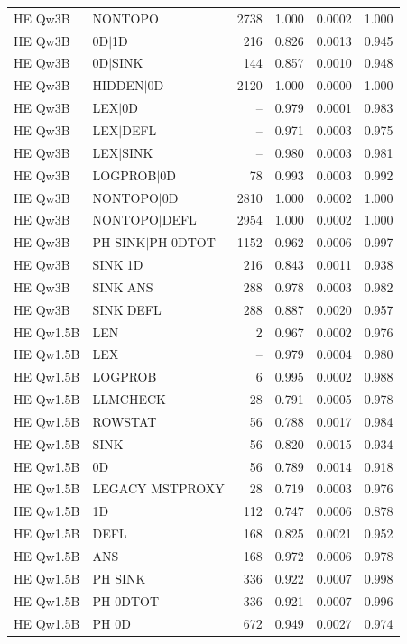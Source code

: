 \begin{longtable}{llrrrr}
HE Qw3B & NONTOPO & 2738 & 1.000 & 0.0002 & 1.000 \\
HE Qw3B & 0D$\mid$1D & 216 & 0.826 & 0.0013 & 0.945 \\
HE Qw3B & 0D$\mid$SINK & 144 & 0.857 & 0.0010 & 0.948 \\
HE Qw3B & HIDDEN$\mid$0D & 2120 & 1.000 & 0.0000 & 1.000 \\
HE Qw3B & LEX$\mid$0D & -- & 0.979 & 0.0001 & 0.983 \\
HE Qw3B & LEX$\mid$DEFL & -- & 0.971 & 0.0003 & 0.975 \\
HE Qw3B & LEX$\mid$SINK & -- & 0.980 & 0.0003 & 0.981 \\
HE Qw3B & LOGPROB$\mid$0D & 78 & 0.993 & 0.0003 & 0.992 \\
HE Qw3B & NONTOPO$\mid$0D & 2810 & 1.000 & 0.0002 & 1.000 \\
HE Qw3B & NONTOPO$\mid$DEFL & 2954 & 1.000 & 0.0002 & 1.000 \\
HE Qw3B & PH SINK$\mid$PH 0DTOT & 1152 & 0.962 & 0.0006 & 0.997 \\
HE Qw3B & SINK$\mid$1D & 216 & 0.843 & 0.0011 & 0.938 \\
HE Qw3B & SINK$\mid$ANS & 288 & 0.978 & 0.0003 & 0.982 \\
HE Qw3B & SINK$\mid$DEFL & 288 & 0.887 & 0.0020 & 0.957 \\
HE Qw1.5B & LEN & 2 & 0.967 & 0.0002 & 0.976 \\
HE Qw1.5B & LEX & -- & 0.979 & 0.0004 & 0.980 \\
HE Qw1.5B & LOGPROB & 6 & 0.995 & 0.0002 & 0.988 \\
HE Qw1.5B & LLMCHECK & 28 & 0.791 & 0.0005 & 0.978 \\
HE Qw1.5B & ROWSTAT & 56 & 0.788 & 0.0017 & 0.984 \\
HE Qw1.5B & SINK & 56 & 0.820 & 0.0015 & 0.934 \\
HE Qw1.5B & 0D & 56 & 0.789 & 0.0014 & 0.918 \\
HE Qw1.5B & LEGACY MSTPROXY & 28 & 0.719 & 0.0003 & 0.976 \\
HE Qw1.5B & 1D & 112 & 0.747 & 0.0006 & 0.878 \\
HE Qw1.5B & DEFL & 168 & 0.825 & 0.0021 & 0.952 \\
HE Qw1.5B & ANS & 168 & 0.972 & 0.0006 & 0.978 \\
HE Qw1.5B & PH SINK & 336 & 0.922 & 0.0007 & 0.998 \\
HE Qw1.5B & PH 0DTOT & 336 & 0.921 & 0.0007 & 0.996 \\
HE Qw1.5B & PH 0D & 672 & 0.949 & 0.0027 & 0.974 \\

\end{longtable}
